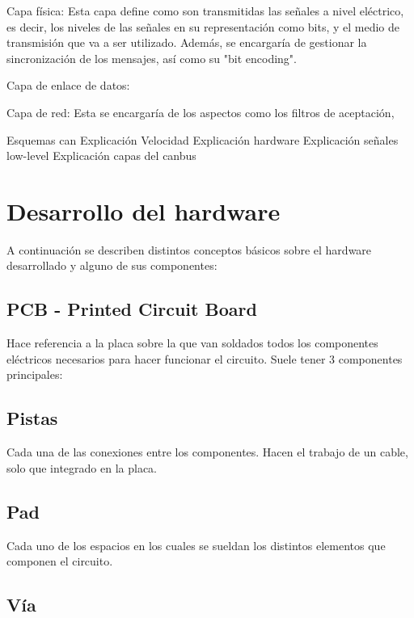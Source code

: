 Capa física: Esta capa define como son transmitidas las señales a nivel eléctrico, es decir, los niveles de las señales en su representación como bits, y el medio de transmisión que va a ser utilizado. Además, se encargaría de gestionar la sincronización de los mensajes, así como su "bit encoding".

Capa de enlace de datos:

Capa de red: Esta se encargaría de los aspectos como los filtros de aceptación, 



Esquemas can
Explicación Velocidad
Explicación hardware
Explicación señales low-level
Explicación capas del canbus


\section{Desarrollo del hardware}\label{desarrollo_del_hardware}

A continuación se describen distintos conceptos básicos sobre el hardware desarrollado y alguno de sus componentes:

\subsection{PCB - Printed Circuit Board}\label{pcb_printed_circuit_board}

Hace referencia a la placa sobre la que van soldados todos los componentes eléctricos necesarios para hacer funcionar el circuito. Suele tener 3 componentes principales:

\subsection{Pistas}\label{pistas}

Cada una de las conexiones entre los componentes. Hacen el trabajo de un cable, solo que integrado en la placa.

\subsection{Pad}\label{pad}

Cada uno de los espacios en los cuales se sueldan los distintos  elementos que componen el circuito.

\subsection{Vía}\label{via}

